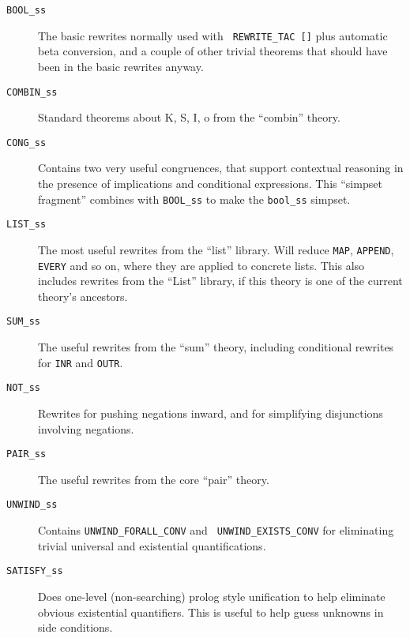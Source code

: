 \begin{description}
\item[{\tt BOOL\_ss}] The basic rewrites normally used with {\tt
    REWRITE\_TAC []} plus automatic beta conversion, and a couple of
  other trivial theorems that should have been in the basic rewrites
  anyway.

\item[{\tt COMBIN\_ss}] Standard theorems about K, S, I, o from the
  ``combin'' theory.

\item[{\tt CONG\_ss}] Contains two very useful congruences, that
  support contextual reasoning in the presence of implications and
  conditional expressions.  This ``simpset fragment'' combines with
  {\tt BOOL\_ss} to make the {\tt bool\_ss} simpset.

\item[{\tt LIST\_ss}] The most useful rewrites from the ``list''
  library.  Will reduce {\tt MAP}, {\tt APPEND}, {\tt EVERY} and so
  on, where they are applied to concrete lists.  This also includes
  rewrites from the ``List'' library, if this theory is one of the
  current theory's ancestors.

\item[{\tt SUM\_ss}] The useful rewrites from the ``sum'' theory,
  including conditional rewrites for {\tt INR} and {\tt OUTR}.

\item[{\tt NOT\_ss}] Rewrites for pushing negations inward, and for
  simplifying disjunctions involving negations.

\item[{\tt PAIR\_ss}] The useful rewrites from the core ``pair''
  theory.

\item[{\tt UNWIND\_ss}] Contains {\tt UNWIND\_FORALL\_CONV} and {\tt
    UNWIND\_EXISTS\_CONV} for eliminating trivial universal and
  existential quantifications.

\item[{\tt SATISFY\_ss}] Does one-level (non-searching) prolog style
  unification to help eliminate obvious existential quantifiers.  This
  is useful to help guess unknowns in side conditions.


\end{description}
